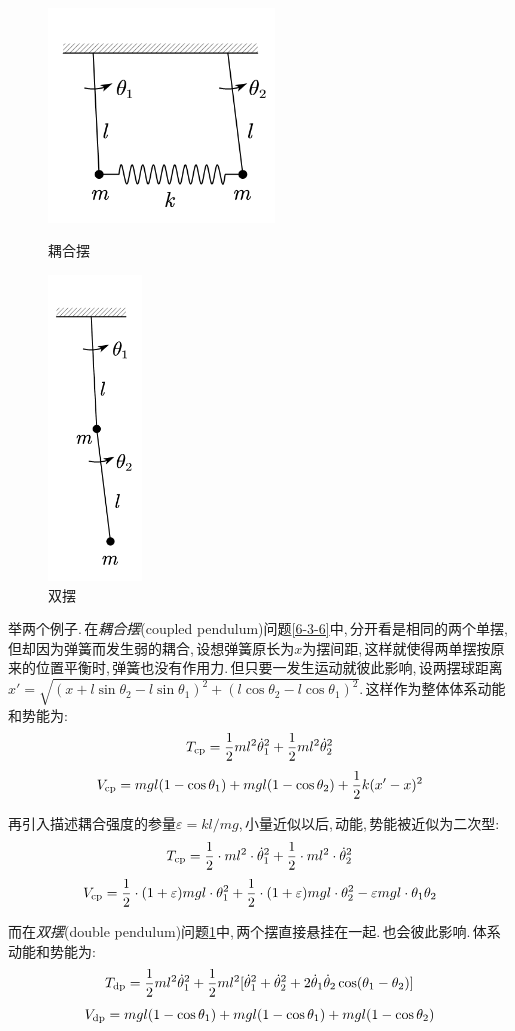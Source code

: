 \begin{figure}
\centering
\includegraphics[width=6cm]{image/6-3-7.png}
\caption{耦合摆}\label{6-3-6}
\includegraphics[width=2.5cm]{image/6-3-6.png}
\caption{双摆}\label{6-3-7}
\end{figure}
举两个例子.\,在\emph{耦合摆}(coupled pendulum)问题\ref{6-3-6}中,\,分开看是相同的两个单摆,\,但却因为弹簧而发生弱的耦合,\,设想弹簧原长为$x$为摆间距,\,这样就使得两单摆按原来的位置平衡时,\,弹簧也没有作用力.\,但只要一发生运动就彼此影响,\,设两摆球距离$x'=\sqrt{(x+l\sin\theta_2-l\sin\theta_1)^2+(l\cos\theta_2-l\cos\theta_1)^2}$.\,这样作为整体体系动能和势能为:
\[T_{\rm cp}=\frac{1}{2}ml^2\dot{\theta}_1^2+\frac{1}{2}ml^2\dot{\theta}_2^2\]
\[V_{\rm cp}=mgl(1-\cos\theta_1)+mgl(1-\cos\theta_2)+\frac{1}{2}k(x'-x)^2\]

再引入描述耦合强度的参量$\varepsilon=kl/mg$,\,小量近似以后,\,动能,\,势能被近似为二次型:
\[T_{\rm cp}=\frac{1}{2}\cdot ml^2\cdot \dot{\theta}_1^2+\frac{1}{2}\cdot ml^2\cdot \dot{\theta}_2^2\]
\[V_{\rm cp}=\frac{1}{2}\cdot (1+\varepsilon)mgl\cdot{\theta}_1^2+\frac{1}{2}\cdot (1+\varepsilon)mgl\cdot{\theta}_2^2-\varepsilon mgl\cdot {\theta}_1{\theta}_2\]

而在\emph{双摆}(double pendulum)问题\ref{6-3-7}中,\,两个摆直接悬挂在一起.\,也会彼此影响.\,体系动能和势能为:
\[T_{\rm dp}=\frac{1}{2}ml^2\dot{\theta}_1^2+\frac{1}{2}ml^2[\dot{\theta}_1^2+\dot{\theta}_2^2+2\dot{\theta}_1\dot{\theta}_2\cos(\theta_1-\theta_2)]\]
\[V_{\rm dp}=mgl(1-\cos\theta_1)+mgl(1-\cos\theta_1)+mgl(1-\cos\theta_2)\]


